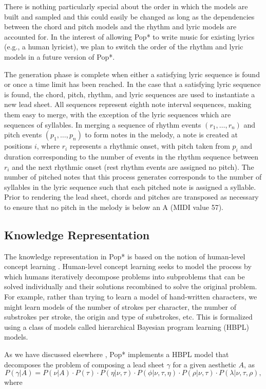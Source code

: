 \documentclass[phd,electronic,oneside,twosidetoc,letterpaper,chaptercenter,parttop,lof,lot]{byumsphd}
\begin{document}
There is nothing particularly special about the order in which the models are built and sampled and this could easily be changed as long as the dependencies between the chord and pitch models and the rhythm and lyric models are accounted for. In the interest of allowing Pop* to write music for existing lyrics (e.g., a human lyricist), we plan to switch the order of the rhythm and lyric models in a future version of Pop*.

The generation phase is complete when either a satisfying lyric sequence is found or once a time limit has been reached. In the case that a satisfying lyric sequence is found, the chord, pitch, rhythm, and lyric sequences are used to instantiate a new lead sheet. All sequences represent eighth note interval sequences, making them easy to merge, with the exception of the lyric sequences which are sequences of syllables. In merging a sequence of rhythm events $(r_1,\dots,r_n)$ and pitch events $(p_1,\dots,p_n)$ to form notes in the melody, a note is created at positions $i$, where $r_i$ represents a rhythmic onset, with pitch taken from $p_i$ and duration corresponding to the number of events in the rhythm sequence between $r_i$ and the next rhythmic onset (rest rhythm events are assigned no pitch). The number of pitched notes that this process generates corresponds to the number of syllables in the lyric sequence such that each pitched note is assigned a syllable. Prior to rendering the lead sheet, chords and pitches are transposed as necessary to ensure that no pitch in the melody is below an A (MIDI value 57).

\subsection{Knowledge Representation}

The knowledge representation in Pop* is based on the notion of human-level concept learning \citep{Lake2015}. Human-level concept learning seeks to model the process by which humans iteratively decompose problems into subproblems that can be solved individually and their solutions recombined to solve the original problem. For example, rather than trying to learn a model of hand-written characters, we might learn models of the number  of strokes per character, the number of substrokes per stroke, the origin and type of substrokes, etc. This is formalized using a class of models called hierarchical Bayesian program learning (HBPL) models.

As we have discussed elsewhere \citep{Bodily2017ComputationalLearning}, Pop* implements a HBPL model that decomposes the problem of composing a lead sheet $\gamma$ for a given aesthetic $A$, as
\[
P(\gamma|A) = P(\nu|A)\cdot P(\tau)\cdot P(\eta|\nu,\tau)\cdot P(\phi|\nu,\tau,\eta)\cdot P(\rho|\nu,\tau)\cdot P(\lambda|\nu,\tau,\rho), 
\]
\noindent where 
\end{document}
